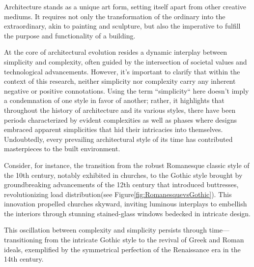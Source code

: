 


Architecture stands as a unique art form, setting itself apart from other creative mediums.
It requires not only the transformation of the ordinary into the extraordinary, akin to painting and sculpture, but also the imperative to fulfill the purpose and functionality of a building\cite{Hnin2022}.

At the core of architectural evolution resides a dynamic interplay between simplicity and complexity, often guided by the intersection of societal values and technological advancements\cite{Economakis2023}.
However, it's important to clarify that within the context of this research, neither simplicity nor complexity carry any inherent negative or positive connotations.
Using the term ``simplicity`` here doesn't imply a condemnation of one style in favor of another;
rather, it highlights that throughout the history of architecture and its various styles, there have been periods characterized by evident complexities as well as phases where designs embraced apparent simplicities that hid their intricacies into themselves.
Undoubtedly, every prevailing architectural style of its time has contributed masterpieces to the built environment.

Consider, for instance, the transition from the robust Romanesque classic style of the 10th century, notably exhibited in churches, to the Gothic style brought by groundbreaking advancements of the 12th century that introduced buttresses, revolutionizing load distribution\cite{Arora2023}(see Figure\ref{fig:RomanesquevsGothic}).
This innovation propelled churches skyward, inviting luminous interplays to embellish the interiors through stunning stained-glass windows bedecked in intricate design\cite{Stacbond2020}.

This oscillation between complexity and simplicity persists through time— transitioning from the intricate Gothic style to the revival of Greek and Roman ideals, exemplified by the symmetrical perfection of the Renaissance era in the 14th century.

